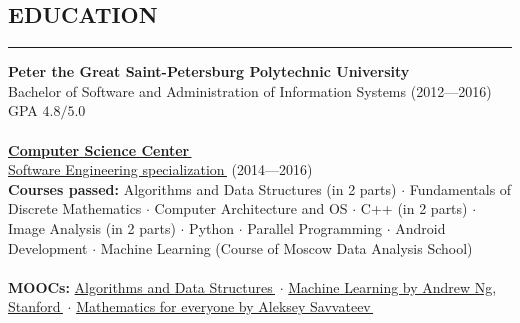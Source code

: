 \documentclass[11pt]{res} %
\let\orighref\href
\renewcommand{\href}[2]{\orighref{#1}{#2\,\faExternalLink}}
\begin{document}
\begin{resume}
\section{\uppercase{Education}} 
\begin{spacing}{0.3}
\textcolor[RGB]{220,220,220}{\rule{\linewidth}{0.4pt}} 
\end{spacing}
\noindent \textbf{Peter the Great Saint-Petersburg Polytechnic University} \\
Bachelor of Software and Administration of Information Systems (2012---2016) \\
GPA $4.8/5.0$ \\ \\ 
\textbf{\href{https://compscicenter.ru/about/}{Computer Science Center}} \\
\href{https://compscicenter.ru/users/801/}{Software Engineering specialization} (2014---2016) \\
\textbf{Courses passed:} Algorithms and Data Structures (in 2 parts) $\cdot$ Fundamentals of Discrete Mathematics $\cdot$ Computer Architecture and OS $\cdot$ C++ (in 2 parts) $\cdot$ Image Analysis (in 2 parts) $\cdot$ Python $\cdot$ Parallel Programming $\cdot$ Android Development $\cdot$ Machine Learning (Course of Moscow Data Analysis School) \\ \\ 
\noindent \textbf{MOOCs:} \href{https://stepik.org/certificate/c97c48eb77cd3edbf2b4cb8d1624930ffe87cb7c.pdf}{Algorithms and Data Structures} $\cdot$ \href{https://www.coursera.org/learn/machine-learning}{Machine Learning by Andrew Ng, Stanford} $\cdot$ \href{https://www.coursera.org/learn/matematika-dlya-vseh}{Mathematics for everyone by Aleksey Savvateev}

\null\newpage


\end{resume}
\end{document}
